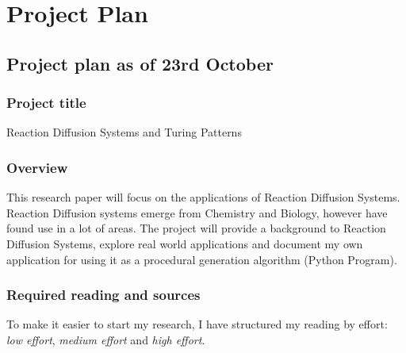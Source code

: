 \documentclass[a4paper, 11pt]{article}
\begin{document}
\printbibliography

\pagebreak
\section{Project Plan}
\label{sec:plan}

\subsection*{Project plan as of 23rd October}

\subsubsection*{Project title}
Reaction Diffusion Systems and Turing Patterns

\subsubsection*{Overview}
This research paper will focus on the applications of Reaction Diffusion Systems. Reaction Diffusion systems emerge from Chemistry and Biology, however have found use in a lot of areas. The project will provide a background to Reaction Diffusion Systems, explore real world applications and document my own application for using it as a procedural generation algorithm (Python Program).

\subsubsection*{Required reading and sources}
To make it easier to start my research, I have structured my reading by effort: \emph{low effort}, \emph{medium effort} and \emph{high effort}.
\end{document}
